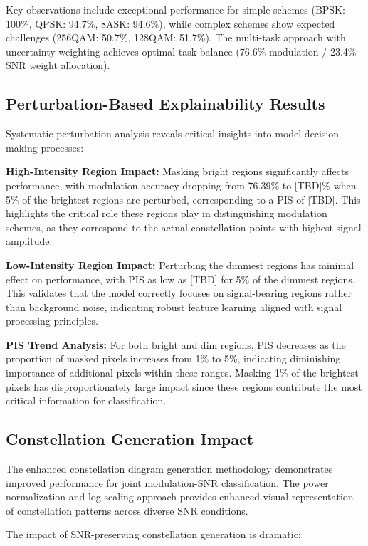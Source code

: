 \documentclass{ELSP}
\begin{document}
{{Key observations include exceptional performance for simple schemes (BPSK: 100\%, QPSK: 94.7\%, 8ASK: 94.6\%), while complex schemes show expected challenges (256QAM: 50.7\%, 128QAM: 51.7\%). The multi-task approach with uncertainty weighting achieves optimal task balance (76.6\% modulation / 23.4\% SNR weight allocation).

\subsection{Perturbation-Based Explainability Results}

Systematic perturbation analysis reveals critical insights into model decision-making processes:

\textbf{High-Intensity Region Impact:} Masking bright regions significantly affects performance, with modulation accuracy dropping from 76.39\% to [TBD]\% when 5\% of the brightest regions are perturbed, corresponding to a PIS of [TBD]. This highlights the critical role these regions play in distinguishing modulation schemes, as they correspond to the actual constellation points with highest signal amplitude.

\textbf{Low-Intensity Region Impact:} Perturbing the dimmest regions has minimal effect on performance, with PIS as low as [TBD] for 5\% of the dimmest regions. This validates that the model correctly focuses on signal-bearing regions rather than background noise, indicating robust feature learning aligned with signal processing principles.

\textbf{PIS Trend Analysis:} For both bright and dim regions, PIS decreases as the proportion of masked pixels increases from 1\% to 5\%, indicating diminishing importance of additional pixels within these ranges. Masking 1\% of the brightest pixels has disproportionately large impact since these regions contribute the most critical information for classification.

\subsection{Constellation Generation Impact}

The enhanced constellation diagram generation methodology demonstrates improved performance for joint modulation-SNR classification. The power normalization and log scaling approach provides enhanced visual representation of constellation patterns across diverse SNR conditions.

The impact of SNR-preserving constellation generation is dramatic:

}}
\end{document}
